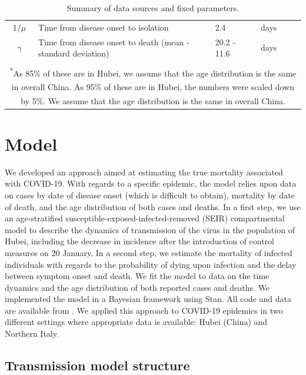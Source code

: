 \documentclass{article}
\begin{document}
\begin{table}[h]
\begin{tabular}{cp{7cm}ll>{\raggedright\arraybackslash}p{2cm}}
			$1/\mu$ & Time from disease onset to isolation & 2.4 & days & \cite{Bi2020} \\
			$\gamma$ & Time from disease onset to death (mean - standard deviation) & 20.2 - 11.6 & days & \cite{Linton2020} \\
			\hline \\[-2.5em]
			\multicolumn{5}{p{18cm}}{\small{\textsuperscript{*}As 85\% of these are in Hubei, we assume that the age distribution is the same in overall China. \textsuperscript{\dag} As 95\% of these are in Hubei, the numbers were scaled down by 5\%. \textsuperscript{\ddag} We assume that the age distribution is the same in overall China.}}
		\end{tabular} 
		\caption{Summary of data sources and fixed parameters.}\label{data_table}
	\end{table}


	
	\clearpage
	\section{Model}
	\label{model}
	
	We developed an approach aimed at estimating the true mortality associated with COVID-19.
	With regards to a specific epidemic, the model relies upon data on cases by date of disease onset (which is difficult to obtain), mortality by date of death, and the age distribution of both cases and deaths.
	In a first step, we use an age-stratified susceptible-exposed-infected-removed (SEIR) compartmental model to describe the dynamics of transmission of the virus in the population of Hubei, including the decrease in incidence after the introduction of control measures on 20 January.
	In a second step, we estimate the mortality of infected individuals with regards to the probability of dying upon infection and the delay between symptom onset and death. 
	We fit the model to data on the time dynamics and the age distribution of both reported cases and deaths.
	We implemented the model in a Bayesian framework using Stan. 
	All code and data are available from \underline{}.
	We applied this approach to COVID-19 epidemics in two different settings where appropriate data is available: Hubei (China) and Northern Italy.
	
	
	\subsection{Transmission model structure}
	
\end{document}
